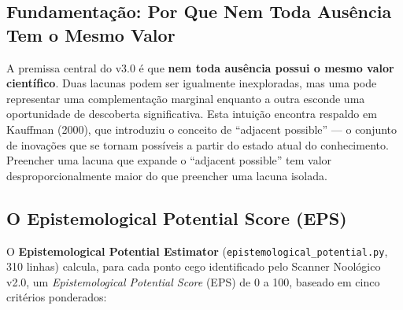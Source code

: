 \documentclass[12pt,a4paper]{article}
\begin{document}
\subsection{Fundamentação: Por Que Nem Toda Ausência Tem o Mesmo Valor}

A premissa central do v3.0 é que \textbf{nem toda ausência possui o mesmo valor científico}. Duas lacunas podem ser igualmente inexploradas, mas uma pode representar uma complementação marginal enquanto a outra esconde uma oportunidade de descoberta significativa. Esta intuição encontra respaldo em Kauffman (2000), que introduziu o conceito de ``adjacent possible'' --- o conjunto de inovações que se tornam possíveis a partir do estado atual do conhecimento. Preencher uma lacuna que expande o ``adjacent possible'' tem valor desproporcionalmente maior do que preencher uma lacuna isolada.

\subsection{O Epistemological Potential Score (EPS)}

O \textbf{Epistemological Potential Estimator} (\texttt{epistemological\_potential.py}, 310 linhas) calcula, para cada ponto cego identificado pelo Scanner Noológico v2.0, um \textit{Epistemological Potential Score} (EPS) de 0 a 100, baseado em cinco critérios ponderados:
\end{document}
